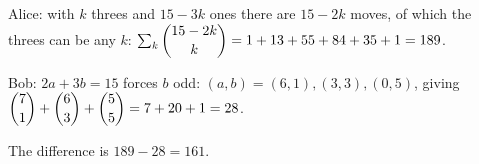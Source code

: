 Alice: with $k$ threes and $15-3k$ ones there are $15-2k$ moves, of which the threes can be any $k$: $\sum_k\dbinom{15-2k}k=1+13+55+84+35+1=189$.

Bob: $2a+3b=15$ forces $b$ odd: $(a,b)=(6,1),(3,3),(0,5)$, giving $\dbinom71+\dbinom63+\dbinom55=7+20+1=28$.

The difference is $189-28=\boxed{161}$.
